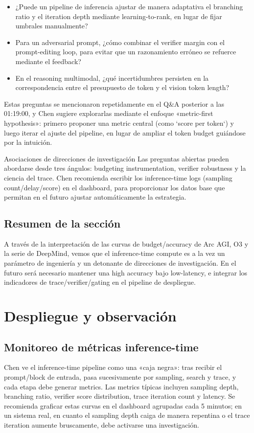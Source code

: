 \documentclass[a4paper]{article}
\begin{document}
\begin{itemize}
\item ¿Puede un pipeline de inferencia ajustar de manera adaptativa el branching ratio y el iteration depth mediante learning-to-rank, en lugar de fijar umbrales manualmente?
\item Para un adversarial prompt, ¿cómo combinar el verifier margin con el prompt-editing loop, para evitar que un razonamiento erróneo se refuerce mediante el feedback?
\item En el reasoning multimodal, ¿qué incertidumbres persisten en la correspondencia entre el presupuesto de token y el vision token length?
\end{itemize}

Estas preguntas se mencionaron repetidamente en el Q\&A posterior a las 01:19:00, y Chen sugiere explorarlas mediante el enfoque «metric-first hypothesis»: primero proponer una metric central (como `score per token`) y luego iterar el ajuste del pipeline, en lugar de ampliar el token budget guiándose por la intuición.

\begin{knowledgebox}{Asociaciones de direcciones de investigación}
Las preguntas abiertas pueden abordarse desde tres ángulos: budgeting instrumentation, verifier robustness y la ciencia del trace. Chen recomienda escribir los inference-time logs (sampling count/delay/score) en el dashboard, para proporcionar los datos base que permitan en el futuro ajustar automáticamente la estrategia.
\end{knowledgebox}

\subsection{Resumen de la sección}
A través de la interpretación de las curvas de budget/accuracy de Arc AGI, O3 y la serie de DeepMind, vemos que el inference-time compute es a la vez un parámetro de ingeniería y un detonante de direcciones de investigación. En el futuro será necesario mantener una high accuracy bajo low-latency, e integrar los indicadores de trace/verifier/gating en el pipeline de despliegue.

\section{Despliegue y observación}

\subsection{Monitoreo de métricas inference-time}
Chen ve el inference-time pipeline como una «caja negra»: tras recibir el prompt/block de entrada, pasa sucesivamente por sampling, search y trace, y cada etapa debe generar metrics. Las metrics típicas incluyen sampling depth, branching ratio, verifier score distribution, trace iteration count y latency. Se recomienda graficar estas curvas en el dashboard agrupadas cada 5 minutos; en un sistema real, en cuanto el sampling depth caiga de manera repentina o el trace iteration aumente bruscamente, debe activarse una investigación.
\end{document}
